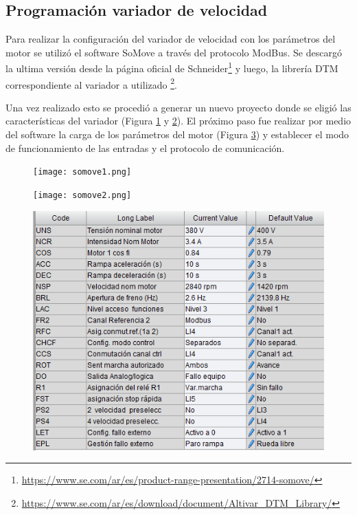 
\subsection{Programación variador de velocidad}


Para realizar la configuración del variador de velocidad con los parámetros del motor se utilizó el software SoMove a través del protocolo ModBus. Se descargó la ultima versión desde la página oficial de Schneider\footnote{\url{https://www.se.com/ar/es/product-range-presentation/2714-somove/}} y luego, la librería DTM correspondiente al variador a utilizado \footnote{\url{https://www.se.com/ar/es/download/document/Altivar_DTM_Library/}}.

Una vez realizado esto se procedió a generar un nuevo proyecto donde se eligió las características del variador (Figura \ref{fig:so1} y \ref{fig:so2}). El próximo paso fue realizar por medio del software la carga de los parámetros del motor (Figura \ref{fig:paramsomove}) y establecer el modo de funcionamiento de las entradas y el protocolo de comunicación.
\begin{figure}[h]
	\centering
	\texttt{[image: somove1.png]}
	\label{fig:so1}
\end{figure}
\begin{figure}[H]
	\centering
	\texttt{[image: somove2.png]}
	\label{fig:so2}
\end{figure}

\begin{figure}[H]
	\centering
	\includegraphics[width=0.9\linewidth]{images/paramsomove}
	\label{fig:paramsomove}
\end{figure}


